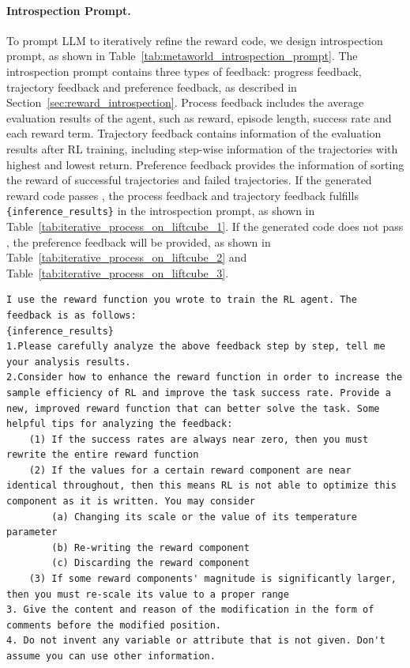 \documentclass{article}
\theoremstyle{plain}
\theoremstyle{definition}
\theoremstyle{remark}
\begin{document}
\paragraph{Introspection Prompt.}\label{app:introspection_prompt}
To prompt LLM to iteratively refine the reward code, we design introspection prompt, as shown in Table~\ref{tab:metaworld_introspection_prompt}. The introspection prompt contains three types of feedback: progress feedback, trajectory feedback and preference feedback, as described in Section~\ref{sec:reward_introspection}. 
Process feedback includes the average evaluation results of the agent, such as reward, episode length, success rate and each reward term. Trajectory feedback contains information of the evaluation results after RL training, including step-wise information of the trajectories with highest and lowest return.
Preference feedback provides the information of sorting the reward of successful trajectories and failed trajectories. If the generated reward code passes \TPE, the process feedback and trajectory feedback fulfills \texttt{\{inference\_results\}} in the introspection prompt, as shown in Table~\ref{tab:iterative_process_on_liftcube_1}.
If the generated code does not pass \TPE, the preference feedback will be provided, as shown in Table~\ref{tab:iterative_process_on_liftcube_2} and Table~\ref{tab:iterative_process_on_liftcube_3}.

\begin{table}[!ht]
\centering
\caption{Introspection prompt of \MW tasks.}
\begin{tcolorbox}
\begin{lstlisting}[breaklines]
I use the reward function you wrote to train the RL agent. The feedback is as follows:
{inference_results}
1.Please carefully analyze the above feedback step by step, tell me your analysis results.
2.Consider how to enhance the reward function in order to increase the sample efficiency of RL and improve the task success rate. Provide a new, improved reward function that can better solve the task. Some helpful tips for analyzing the feedback:
    (1) If the success rates are always near zero, then you must rewrite the entire reward function
    (2) If the values for a certain reward component are near identical throughout, then this means RL is not able to optimize this component as it is written. You may consider
        (a) Changing its scale or the value of its temperature parameter
        (b) Re-writing the reward component 
        (c) Discarding the reward component
    (3) If some reward components' magnitude is significantly larger, then you must re-scale its value to a proper range
3. Give the content and reason of the modification in the form of comments before the modified position.
4. Do not invent any variable or attribute that is not given. Don't assume you can use other information.
\end{lstlisting}
\end{tcolorbox}
\label{tab:metaworld_introspection_prompt}
\end{table}
\end{document}
